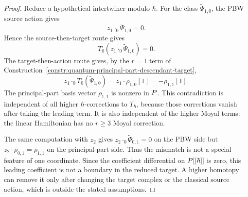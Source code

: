\begin{proof}
  Reduce a hypothetical intertwiner modulo \(\hbar\).  For the class
  \(\widetilde\Psi_{1,0}\), the PBW source action gives
  \[
    z_1\cdot_0\widetilde\Psi_{1,0}=0.
  \]
  Hence the source-then-target route gives
  \[
    T_0(z_1\cdot_0\widetilde\Psi_{1,0})=0.
  \]
  The target-then-action route gives, by the \(r=1\) term of
  Construction~\ref{constr:quantum-principal-part-descendant-target},
  \[
    z_1\cdot_0T_0(\widetilde\Psi_{1,0})
      =z_1\cdot\rho_{1,0}[1]
      =-\rho_{1,1}[1].
  \]
  The principal-part basis vector \(\rho_{1,1}\) is nonzero in
  \(P\).  This contradiction is independent of all higher
  \(\hbar\)-corrections to \(T_\hbar\), because those corrections vanish
  after taking the leading term.  It is also independent of the higher
  Moyal terms: the linear Hamiltonian has no \(r\geq3\) Moyal
  correction.

  The same computation with \(z_2\) gives
  \(z_2\cdot_0\widetilde\Psi_{0,1}=0\) on the PBW side but
  \(z_2\cdot\rho_{0,1}=\rho_{1,1}\) on the principal-part side.  Thus
  the mismatch is not a special feature of one coordinate.
  Since the coefficient differential on \(P[[\hbar]]\) is zero,
  this leading coefficient is not a boundary in the reduced target.
  A higher homotopy can remove it only after changing the target
  complex or the classical source action, which is outside the stated
  assumptions.
\end{proof}

